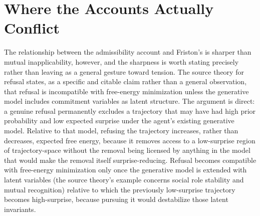 \documentclass[11pt]{article}
\theoremstyle{plain}
\begin{document}
\section{Where the Accounts Actually Conflict}
\label{sec:friction}

The relationship between the admissibility account and Friston's is sharper than mutual inapplicability, however, and the sharpness is worth stating precisely rather than leaving as a general gesture toward tension. The source theory for refusal states, as a specific and citable claim rather than a general observation, that refusal is incompatible with free-energy minimization unless the generative model includes commitment variables as latent structure. The argument is direct: a genuine refusal permanently excludes a trajectory that may have had high prior probability and low expected surprise under the agent's existing generative model. Relative to that model, refusing the trajectory increases, rather than decreases, expected free energy, because it removes access to a low-surprise region of trajectory-space without the removal being licensed by anything in the model that would make the removal itself surprise-reducing. Refusal becomes compatible with free-energy minimization only once the generative model is extended with latent variables (the source theory's example concerns social role stability and mutual recognition) relative to which the previously low-surprise trajectory becomes high-surprise, because pursuing it would destabilize those latent invariants.
\end{document}
